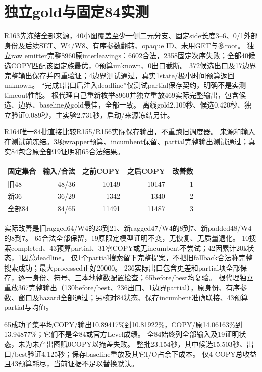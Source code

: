 \documentclass[UTF8,11pt,a4paper]{ctexart}
\begin{document}
\section{独立gold与固定84实测}
R163先冻结全部来源，40小图覆盖至少一侧二元分支、固定side长度3--6、0/1外部身份及后续SET、W4/W8、有序参数翻转、opaque ID、未用GET与多root。
独立raw emitter完整8960原interleavings：6602合法，2358固定次序失败；全部40候选COPY匹配该固定族最优，0预算unknown、0出口截断。
372候选出口及17边界完整输出保存并四重验证；4边界测试通过，真实1state/极小时间预算返回unknown。
“完成1出口后注入deadline”仅测试partial保存契约，明确不是实测timeout性能。
根代理自己重新枚举8960并独立重放469实际完整输出，包含候选、边界、baseline及gold最佳，全部一致。
离线gold2.109秒、候选0.420秒、独立验证0.089秒，主实验2.731秒，启动/来源冻结另计。

R164唯一84批直接比较R155/R156实际保存输出，不重跑旧调度器。
来源和输入在测试前冻结。3项wrapper预算、incumbent保留、partial完整输出测试通过；真实84包含原全部19证明和65合法结果。
\begin{center}\small
\begin{tabular}{lrrrr}
\toprule
固定集合&输入/合法&之前COPY&之后COPY&改善数\\
\midrule
旧48&48/36&10149&10147&1\\
新36&36/29&1342&1340&2\\
全部84&84/65&11491&11487&3\\
\bottomrule
\end{tabular}
\end{center}
实际改善是旧ragged64/W4的23到21、新ragged47/W4的8到7、新padded48/W4的8到7。
65合法全部保留，19原限定模型证明不变，无恢复、无质量退化。
10搜索completed、43预算partial、31零COPY或无incumbent不尝试；42因累计20k状态，1因总deadline。
仅1个partial搜索留下完整提案，不把旧fallback合法称完整搜索成功；最大processed正好20000。
236实际出口包含更差和partial项全部保存，逐一身份、符号、三本地整数配置检查；65before/best均复验。
根代理独立重放367完整输出（130before/best、236出口、1边界partial），原身份、有序参数、窗口及hazard全部通过；另核对84状态、保存incumbent准确联接、43预算partial与均值。

65成功子集平均COPY/输出10.89417\%到10.81922\%，COPY/原14.06163\%到13.94877\%；它们不是全84或官方Level成绩。
全84始终列全部输入及19证明状态，未为未产出图赋0COPY以掩盖失败。
整批23.154秒，其中候选15.503秒、出口/best验证4.125秒；保存baseline重放及其它I/O占余下成本。
仅4 COPY总收益且43预算耗尽，当前证据不足以替换默认。
\end{document}
